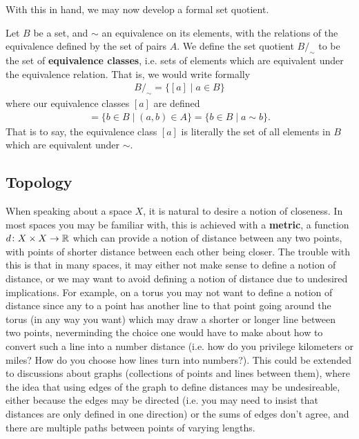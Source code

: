 \documentclass[11pt]{article}
\begin{document}
With this in hand, we may now develop a formal set quotient.

\begin{definition}

Let $B$ be a set, and $\sim$ an equivalence on its elements, with the relations of the equivalence defined by the set of pairs $A$. We define the set quotient $B/_\sim$ to be the set of \textbf{equivalence classes}, i.e. sets of elements which are equivalent under the equivalence relation. That is, we would write formally \begin{gather*}
B/_\sim = \{ [a] \mid a \in B\}
\end{gather*}
where our equivalence classes $[a]$ are defined \begin{gather*}
[a] = \{ b\in B \mid (a,b) \in A\} = \{b \in B \mid a \sim b\}.
\end{gather*}
That is to say, the equivalence class $[a]$ is literally the set of all elements in $B$ which are equivalent under $\sim$.
\end{definition}

\subsection{Topology}

When speaking about a space $X$, it is natural to desire a notion of closeness. In most spaces you may be familiar with, this is achieved with a \textbf{metric}, a function $d\colon X \times X \to \mathbb{R}$ which can provide a notion of distance between any two points, with points of shorter distance between each other being closer. The trouble with this is that in many spaces, it may either not make sense to define a notion of distance, or we may want to avoid defining a notion of distance due to undesired implications. For example, on a torus you may not want to define a notion of distance since any  to a point has another line to that point going around the torus (in any way you want) which may draw a shorter or longer line between two points, neverminding the choice one would have to make about how to convert such a line into a number distance (i.e. how do you privilege kilometers or miles? How do you choose how lines turn into numbers?). This could be extended to discussions about graphs (collections of points and lines between them), where the idea that using edges of the graph to define distances may be undesireable, either because the edges may be directed (i.e. you may need to insist that distances are only defined in one direction) or the sums of edges don't agree, and there are multiple paths between points of varying lengths.
\end{document}
